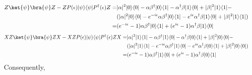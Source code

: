 \begin{equation}
  \begin{split}
    Z \ket{\psi}\bra{\psi}Z - ZP(\epsilon)|\psi\rangle \langle \psi|P^{\dag}(\epsilon)Z = & |\alpha|^{2} |0\rangle \langle 0 | - \alpha \beta^{\dag} |0\rangle \langle 1 | - \alpha^{\dag} \beta |1\rangle \langle 0 | + |\beta|^{2} |1\rangle \langle 1 |  - \\
    & (|\alpha|^{2} |0\rangle \langle 0| - e^{-i\epsilon}\alpha \beta^{\dag} |0\rangle \langle 1 | - e^{i\epsilon} \alpha^{\dag} \beta |1\rangle \langle 0 | + |\beta|^{2} |1\rangle \langle 1 |)\\
  = & (e^{-i\epsilon}-1) \alpha \beta^{\dag} |0\rangle \langle 1 | + (e^{i\epsilon}-1) \alpha^{\dag} \beta |1\rangle \langle 0 |
  \end{split}
\end {equation}
\begin{equation}
  \begin{split}
    XZ \ket{\psi}\bra{\psi}ZX - XZP(\epsilon)|\psi\rangle \langle \psi|P^{\dag}(\epsilon)ZX = & |\alpha|^{2} |1\rangle \langle 1 | - \alpha \beta^{\dag} |1\rangle \langle 0 | - \alpha^{\dag} \beta |0\rangle \langle 1 | + |\beta|^{2} |0\rangle \langle 0 |  - \\
    & (|\alpha|^{2} |1\rangle \langle 1| - e^{-i\epsilon}\alpha \beta^{\dag} |1\rangle \langle 0 | - e^{i\epsilon} \alpha^{\dag} \beta |0\rangle \langle 1 | + |\beta|^{2} |0\rangle \langle 0 |)\\
  = & (e^{-i\epsilon}-1) \alpha \beta^{\dag} |1\rangle \langle 0 | + (e^{i\epsilon}-1) \alpha^{\dag} \beta |0\rangle \langle 1 |
  \end{split}
\end {equation}
Consequently,
